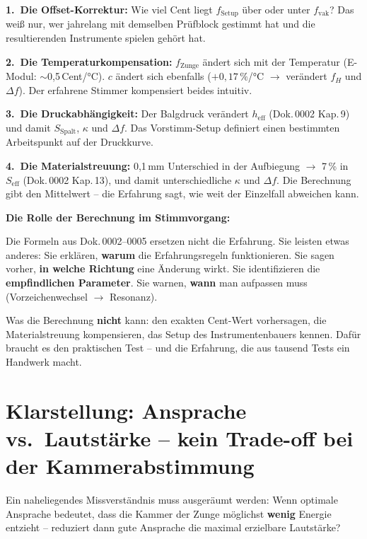 \documentclass[11pt,a4paper]{article}
\begin{document}
\textbf{1.\ Die Offset-Korrektur:} Wie viel Cent liegt $f_\text{Setup}$ über oder unter $f_\text{vak}$? Das weiß nur, wer jahrelang mit demselben Prüfblock gestimmt hat und die resultierenden Instrumente spielen gehört hat.

\textbf{2.\ Die Temperaturkompensation:} $f_\text{Zunge}$ ändert sich mit der Temperatur (E-Modul: $\sim$0{,}5\,Cent/°C). $c$ ändert sich ebenfalls ($+0{,}17\,\%$/°C $\to$ verändert $f_H$ und $\Delta f$). Der erfahrene Stimmer kompensiert beides intuitiv.

\textbf{3.\ Die Druckabhängigkeit:} Der Balgdruck verändert $h_\text{eff}$ (Dok.\,0002 Kap.\,9) und damit $S_\text{Spalt}$, $\kappa$ und $\Delta f$. Das Vorstimm-Setup definiert einen bestimmten Arbeitspunkt auf der Druckkurve.

\textbf{4.\ Die Materialstreuung:} 0{,}1\,mm Unterschied in der Aufbiegung $\to$ 7\,\% in $S_\text{eff}$ (Dok.\,0002 Kap.\,13), und damit unterschiedliche $\kappa$ und $\Delta f$. Die Berechnung gibt den Mittelwert -- die Erfahrung sagt, wie weit der Einzelfall abweichen kann.

\begin{keybox}
\textbf{Die Rolle der Berechnung im Stimmvorgang:}

Die Formeln aus Dok.\,0002--0005 ersetzen nicht die Erfahrung. Sie leisten etwas anderes: Sie erklären, \textbf{warum} die Erfahrungsregeln funktionieren. Sie sagen vorher, \textbf{in welche Richtung} eine Änderung wirkt. Sie identifizieren die \textbf{empfindlichen Parameter}. Sie warnen, \textbf{wann} man aufpassen muss (Vorzeichenwechsel $\to$ Resonanz).

Was die Berechnung \textbf{nicht} kann: den exakten Cent-Wert vorhersagen, die Materialstreuung kompensieren, das Setup des Instrumentenbauers kennen. Dafür braucht es den praktischen Test -- und die Erfahrung, die aus tausend Tests ein Handwerk macht.
\end{keybox}

\section{Klarstellung: Ansprache vs.\ Lautstärke -- kein Trade-off bei der Kammerabstimmung}

Ein naheliegendes Missverständnis muss ausgeräumt werden: Wenn optimale Ansprache bedeutet, dass die Kammer der Zunge möglichst \textbf{wenig} Energie entzieht -- reduziert dann gute Ansprache die maximal erzielbare Lautstärke?
\end{document}
